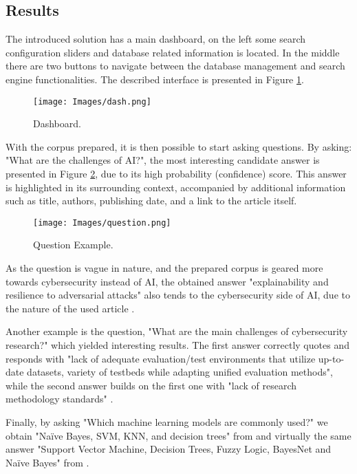 \documentclass[runningheads]{llncs}
\begin{document}
\subsection{Results}

The introduced solution has a main dashboard, on the left some search configuration sliders and database related information is located. In the middle there are two buttons to navigate between the database management and search engine functionalities. The described interface is presented in Figure \ref{fig:dash}.

\begin{figure}[H]
\centering
\texttt{[image: Images/dash.png]}
\caption{Dashboard.}
\label{fig:dash}
\end{figure}

With the corpus prepared, it is then possible to start asking questions. By asking: "What are the challenges of AI?", the most interesting candidate answer is presented in Figure \ref{fig:qa}, due to its high probability (confidence) score. This answer is highlighted in its surrounding context, accompanied by additional information such as title, authors, publishing date, and a link to the article itself.

\begin{figure}[H]
\centering
\texttt{[image: Images/question.png]}
\caption{Question Example.}
\label{fig:qa}
\end{figure}

As the question is vague in nature, and the prepared corpus is geared more towards cybersecurity instead of AI, the obtained answer "explainability and resilience to adversarial attacks" also tends to the cybersecurity side of AI, due to the nature of the used article \cite{Morla2019TenAS}.

Another example is the question,
"What are the main challenges of cybersecurity research?" which yielded interesting results. The first answer correctly quotes \cite{2021arXiv210103564K} and responds with "lack of adequate evaluation/test environments that utilize up-to-date datasets, variety of testbeds while adapting unified evaluation methods", while the second answer builds on the first one with "lack of research methodology standards" \cite{Gardner2019UsingCC}.

Finally, by asking "Which machine learning models are commonly used?" we obtain "Naïve Bayes, SVM, KNN, and decision trees" from \cite{cmc.2021.013852} and virtually the same answer "Support Vector Machine, Decision Trees, Fuzzy Logic, BayesNet and Naïve Bayes" from \cite{SHAH2018157}.
\end{document}
